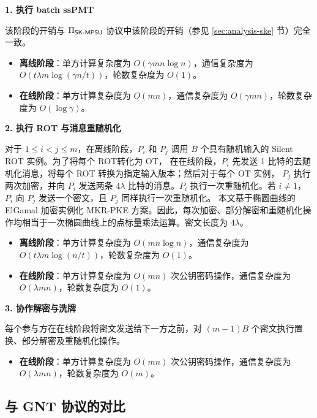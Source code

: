 \begin{trivlist}
\item \textbf{1. 执行 batch ssPMT} 

该阶段的开销与 $\Pi_\mathsf{SK\text{-}MPSU}$ 协议中该阶段的开销（参见 \ref{sec:analysis-ske} 节）完全一致。
\begin{itemize}
\item \textbf{离线阶段}：单方计算复杂度为 $O(\gamma m n\log n)$，通信复杂度为 $O(t \lambda m \log (\gamma n / t))$，轮数复杂度为 $O(1)$。
\item \textbf{在线阶段}：单方计算复杂度为 $O(m n)$，通信复杂度为 $O(\gamma m n)$，轮数复杂度为 $O(\log \gamma)$。
\end{itemize}

\item \textbf{2. 执行 ROT 与消息重随机化} 

对于 $1 \le i < j \le m$，在离线阶段，$P_i$ 和 $P_j$ 调用 $B$ 个具有随机输入的 Silent ROT 实例。为了将每个 ROT转化为 OT， 在在线阶段，$P_i$ 先发送 1 比特的去随机化消息，将每个 ROT 转换为指定输入版本；然后对于每个 OT 实例， $P_j$ 执行两次加密，并向 $P_i$ 发送两条 $4 \lambda$ 比特的消息。$P_i$ 执行一次重随机化。若 $i \ne 1$，$P_i$ 向 $P_j$ 发送一个密文，且 $P_j$ 同样执行一次重随机化。
本文基于椭圆曲线的 ElGamal 加密实例化 MKR-PKE 方案。因此，每次加密、部分解密和重随机化操作均相当于一次椭圆曲线上的点标量乘法运算。密文长度为 $4 \lambda$。
\begin{itemize}
\item \textbf{离线阶段}：单方计算复杂度为 $O(m n\log n)$，通信复杂度为 $O(t \lambda m \log (n / t))$，轮数复杂度为 $O(1)$。
\item \textbf{在线阶段}：单方计算复杂度为 $O(m n)$ 次公钥密码操作，通信复杂度为 $O(\lambda m n)$，轮数复杂度为 $O(1)$。
\end{itemize}

\item \textbf{3. 协作解密与洗牌} 

每个参与方在在线阶段将密文发送给下一方之前，对 $(m-1)B$ 个密文执行置换、部分解密及重随机化操作。
\begin{itemize}
\item \textbf{在线阶段}：单方计算复杂度为 $O(m n)$ 次公钥密码操作，通信复杂度为 $O(\lambda m n)$，轮数复杂度为 $O(m)$。
\end{itemize}
\end{trivlist}

\subsection{与 GNT 协议的对比}

